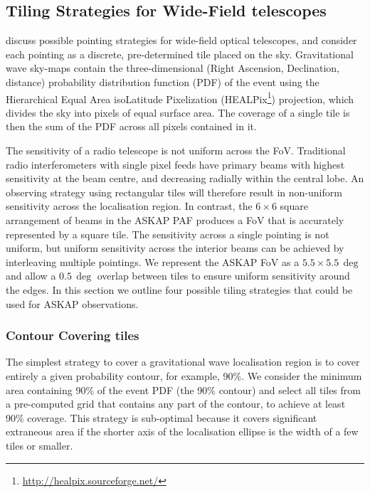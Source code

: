 \subsection{Tiling Strategies for Wide-Field telescopes}
\citet{2016A&A...592A..82G} discuss possible pointing strategies for wide-field optical telescopes, and consider each pointing as a discrete, pre-determined tile placed on the sky. Gravitational wave sky-maps contain the three-dimensional (Right Ascension, Declination, distance) probability distribution function (PDF) of the event using the Hierarchical Equal Area isoLatitude Pixelization (HEALPix\footnote{\url{http://healpix.sourceforge.net/}}) projection, which divides the sky into pixels of equal surface area. The coverage of a single tile is then the sum of the PDF across all pixels contained in it.

The sensitivity of a radio telescope is not uniform across the FoV. Traditional radio interferometers with single pixel feeds have primary beams with highest sensitivity at the beam centre, and decreasing radially within the central lobe. An observing strategy using rectangular tiles will therefore result in non-uniform sensitivity across the localisation region. In contrast, the $6\times6$ square arrangement of beams in the ASKAP PAF produces a FoV that is accurately represented by a square tile. The sensitivity across a single pointing is not uniform, but uniform sensitivity across the interior beams can be achieved by interleaving multiple pointings. We represent the ASKAP FoV as a $5.5\times5.5$\,$\deg$ and allow a $0.5\,\deg$ overlap between tiles to ensure uniform sensitivity around the edges. In this section we outline four possible tiling strategies that could be used for ASKAP observations.



\subsubsection{Contour Covering tiles}
The simplest strategy to cover a gravitational wave localisation region is to cover entirely a given probability contour, for example, 90\%. We consider the minimum area containing 90\% of the event PDF (the 90\% contour) and select all tiles from a pre-computed grid that contains any part of the contour, to achieve at least 90\% coverage. This strategy is sub-optimal because it covers significant extraneous area if the shorter axis of the localisation ellipse is the width of a few tiles or smaller.


